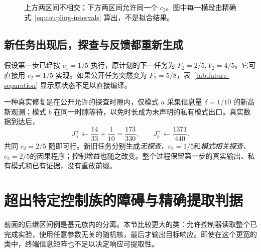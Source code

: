 \documentclass[UTF8,fontset=fandol,11pt,a4paper]{ctexart}
\theoremstyle{definition}
\theoremstyle{remark}
\numberwithin{equation}{section}
\begin{document}
\begin{figure}[htbp]
\centering
{}
\caption{上方两区间不相交；下方两区间允许同一个 $c_2$。图中每一横段由精确式~\eqref{eq:coupling-intervals} 算出，不是拟合结果。}
\label{fig:intervals}
\end{figure}

\subsection{新任务出现后，探查与反馈都重新生成}
假设第一步已经按 $c_1=1/5$ 执行，原计划的下一任务为 $F_2=2/5,V_2=4/5$。它可直接用 $c_2=1/5$ 实现。如果公开任务突然变为 $F_2=5/8$，表~\ref{tab:future-separation} 显示原状态不足以直接编译。

一种真实修复是在公开允许的探查时隙内，仅模式 $a$ 采集信息量 $\delta=1/10$ 的新高斯观测；模式 $b$ 在同一时隙等待，以免时长成为未声明的私有模式出口。真实数据到达后，
\begin{equation}
 J_a^+\leftarrow\frac{14}{33}+\frac1{10}=\frac{173}{330},\qquad
 J_b^+\leftarrow\frac{1371}{440}.
\end{equation}
共同 $c_2=2/5$ 随即可行。新旧任务分别生成\emph{无探查、$c_2=1/5$}和\emph{模式相关探查、$c_2=2/5$}的因果程序；控制增益也随之改变。整个过程保留第一步的真实输出、私有模式和已有证据，没有重放前缀。

\section{超出特定控制族的障碍与精确提取判据}
\label{sec:obstruction}

前面的后继区间例是基元族内的分离。本节比较更大的类：允许控制器读取整个已完成实验，使用任意参数无关的随机核，最后才输出目标响应。即使在这个更宽的类中，终端信息矩阵也不足以决定响应可提取性。
\end{document}
